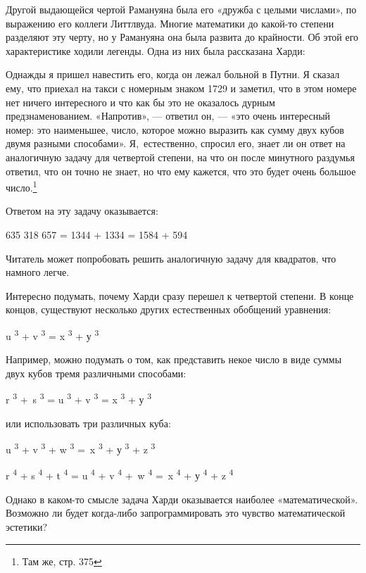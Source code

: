 \documentclass[../main.tex]{subfiles}
\begin{document}
Другой выдающейся чертой Рамануяна была его «дружба с целыми числами», по выражению его коллеги Литтлвуда. Многие математики до какой-то степени разделяют эту черту, но у Рамануяна она была развита до крайности. Об этой его характеристике ходили легенды. Одна из них была рассказана Харди:

Однажды я пришел навестить его, когда он лежал больной в Путни. Я сказал ему, что приехал на такси с номерным знаком 1729 и заметил, что в этом номере нет ничего интересного и что как бы это не оказалось дурным предзнаменованием. «Напротив», --- ответил он, --- «это очень интересный номер: это наименьшее, число, которое можно выразить как сумму двух кубов двумя разными способами». Я,~естественно, спросил его, знает ли он ответ на аналогичную задачу для четвертой степени, на что он после минутного раздумья ответил, что он точно не знает, но что ему кажется, что это будет очень большое число.\footnote{Там же, стр. 375}

Ответом на эту задачу оказывается:

635 318 657 = 1344 + 1334 = 1584 + 594

Читатель может попробовать решить аналогичную задачу для квадратов, что намного легче.

Интересно подумать, почему Харди сразу перешел к четвертой степени. В конце концов, существуют несколько других естественных обобщений уравнения:

u \textsuperscript{3} + v \textsuperscript{3} = x \textsuperscript{3} + у \textsuperscript{3}

Например, можно подумать о том, как представить некое число в виде суммы двух кубов тремя различными способами:

r \textsuperscript{3} +~s \textsuperscript{3} = u \textsuperscript{3} + v \textsuperscript{3} = x \textsuperscript{3} + у \textsuperscript{3}

или использовать три различных куба:

u \textsuperscript{3} + v \textsuperscript{3} + w \textsuperscript{3} =~x \textsuperscript{3} + у \textsuperscript{3} + z \textsuperscript{3}

r \textsuperscript{4} + s \textsuperscript{4} + t \textsuperscript{4} = u \textsuperscript{4} + v \textsuperscript{4} +~w \textsuperscript{4} =~x \textsuperscript{4} + у \textsuperscript{4} + z \textsuperscript{4}

Однако в каком-то смысле задача Харди оказывается наиболее «математической». Возможно ли будет когда-либо запрограммировать это чувство математической эстетики?
\end{document}
